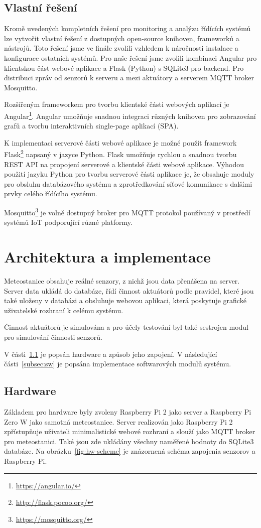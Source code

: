\documentclass[11pt,a4paper]{article}
\begin{document}
\subsection{Vlastní řešení}
Kromě uvedených kompletních řešení pro monitoring a analýzu řídících systémů lze vytvořit vlastní řešení z dostupných open-source knihoven, frameworků a nástrojů. Toto řešení jsme ve finále zvolili vzhledem k náročnosti instalace a konfigurace ostatních systémů. Pro naše řešení jsme zvolili kombinaci Angular pro klientskou část webové aplikace a Flask (Python) s SQLite3 pro backend. Pro distribuci zpráv od senzorů k serveru a mezi aktuátory a serverem MQTT broker Mosquitto.

Rozšířeným frameworkem pro tvorbu klientské části webových aplikací je Angular\footnote{\url{https://angular.io/}}. Angular umožňuje snadnou integraci různých knihoven pro zobrazování grafů a tvorbu interaktivních single-page aplikací (SPA).

K implementaci serverové části webové aplikace je možné použít framework Flask\footnote{\url{http://flask.pocoo.org/}} napsaný v jazyce Python. Flask umožňuje rychlou a snadnou tvorbu REST API na propojení serverové a klientské části webové aplikace. Výhodou použití jazyku Python pro tvorbu serverové části aplikace je, že obsahuje moduly pro obsluhu databázového systému a zprotředkování síťové komunikace s dalšími prvky celého řídícího systému.

Mosquitto\footnote{\url{https://mosquitto.org/}} je volně dostupný broker pro MQTT protokol používaný v prostředí systémů IoT podporující různé platformy.

\section{Architektura a implementace}
Meteostanice obsahuje reálné senzory, z nichž jsou data přenášena na server. Server data ukládá do databáze, řídí činnost aktuátorů podle pravidel, které jsou také uloženy v databázi a obsluhuje webovou aplikaci, která poskytuje grafické uživatelské rozhraní k celému systému.

Činnost aktuátorů je simulována a pro účely testování byl také sestrojen modul pro simulování činnosti senzorů.

V části~\ref{subsec:hw} je popsán hardware a způsob jeho zapojení. V následující části~\ref{subsec:sw} je popsána implementace softwarových modulů systému.

\subsection{Hardware}\label{subsec:hw}
Základem pro hardware byly zvoleny Raspberry Pi 2 jako server a Raspberry Pi Zero W jako samotná meteostanice. Server realizován jako Raspberry Pi 2 zpřístupňuje uživateli minimalistické webové rozhraní a slouží jako MQTT broker pro meteostanici. Také jsou zde ukládány všechny naměřené hodnoty do SQLite3 databáze.
Na obrázku~\ref{fig:hw-scheme} je znázornená schéma zapojenia senzorov a Raspberry Pi.
\end{document}
